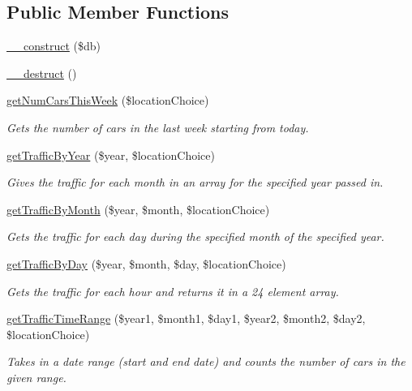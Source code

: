 \subsection*{Public Member Functions}
\begin{DoxyCompactItemize}
\item 
\hyperlink{interface_p_h_pto_s_q_l_interface_a800f8efee13692788b13ee57c5960092}{\+\_\+\+\_\+construct} (\$db)
\item 
\hyperlink{interface_p_h_pto_s_q_l_interface_a421831a265621325e1fdd19aace0c758}{\+\_\+\+\_\+destruct} ()
\item 
\hyperlink{interface_p_h_pto_s_q_l_interface_a6e6deaf037e5413c56743ab1985fc0b6}{get\+Num\+Cars\+This\+Week} (\$location\+Choice)
\begin{DoxyCompactList}\small\item\em Gets the number of cars in the last week starting from today. \end{DoxyCompactList}\item 
\hyperlink{interface_p_h_pto_s_q_l_interface_a88bd9a6c7f64a8f733270a7134204ebb}{get\+Traffic\+By\+Year} (\$year, \$location\+Choice)
\begin{DoxyCompactList}\small\item\em Gives the traffic for each month in an array for the specified year passed in. \end{DoxyCompactList}\item 
\hyperlink{interface_p_h_pto_s_q_l_interface_a2389b15a72a087f39f462b1ff8f8ef95}{get\+Traffic\+By\+Month} (\$year, \$month, \$location\+Choice)
\begin{DoxyCompactList}\small\item\em Gets the traffic for each day during the specified month of the specified year. \end{DoxyCompactList}\item 
\hyperlink{interface_p_h_pto_s_q_l_interface_a6278f024da07a6ff95ffcf3efc6c0c5d}{get\+Traffic\+By\+Day} (\$year, \$month, \$day, \$location\+Choice)
\begin{DoxyCompactList}\small\item\em Gets the traffic for each hour and returns it in a 24 element array. \end{DoxyCompactList}\item 
\hyperlink{interface_p_h_pto_s_q_l_interface_ac91d0c56506620188f25007d30f1e8d0}{get\+Traffic\+Time\+Range} (\$year1, \$month1, \$day1, \$year2, \$month2, \$day2, \$location\+Choice)
\begin{DoxyCompactList}\small\item\em Takes in a date range (start and end date) and counts the number of cars in the given range. \end{DoxyCompactList}\item 

\end{DoxyCompactItemize}
